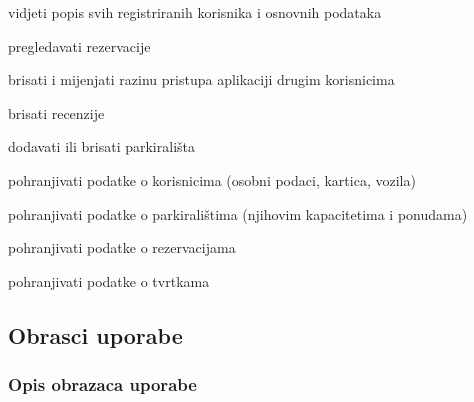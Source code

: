\begin{packed_enum}
\begin{packed_enum}
	\end{packed_enum}
	
	\item {}
	
	\begin{packed_enum}
		
		\item vidjeti popis svih registriranih korisnika i osnovnih podataka
		\item pregledavati rezervacije
		\item brisati i mijenjati razinu pristupa aplikaciji drugim korisnicima
		\item brisati recenzije
		\item dodavati ili brisati parkirališta
		
	\end{packed_enum}
	
	\item {}
	
	\begin{packed_enum}
		
		\item pohranjivati podatke o korisnicima (osobni podaci, kartica, vozila)
		\item pohranjivati podatke o parkiralištima (njihovim kapacitetima i ponudama)
		\item pohranjivati podatke o rezervacijama
		\item pohranjivati podatke o tvrtkama
		
	\end{packed_enum}
\end{packed_enum}


\eject 



\subsection{Obrasci uporabe}

\subsubsection{Opis obrazaca uporabe}


\newcommand\showuccounter{\stepcounter{uccounter}\theuccounter}


